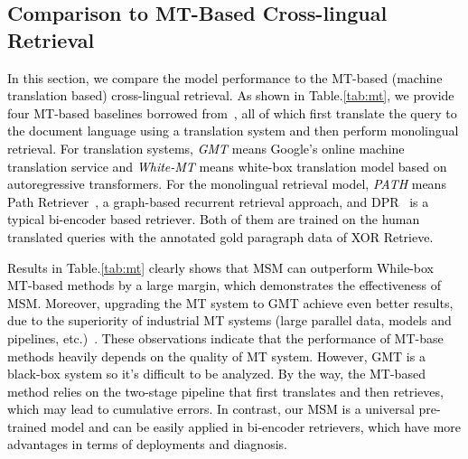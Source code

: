 \subsection{Comparison to MT-Based Cross-lingual Retrieval}
\textcolor{black}{
In this section, we compare the model performance to the MT-based (machine translation based) cross-lingual retrieval. As shown in Table.\ref{tab:mt}, we provide four MT-based baselines borrowed from~\citep{asai-etal-2021-xor}, all of which first translate the query to the document language using a translation system and then perform monolingual retrieval. For translation systems, \textit{GMT} means Google’s online machine translation service and \textit{White-MT} means white-box translation model based on autoregressive transformers. For the monolingual retrieval model, \textit{PATH} means Path Retriever~\citep{asai2019learning}, a graph-based recurrent retrieval approach, and DPR~\citep{DPR2020} is a typical bi-encoder based retriever. Both of them are trained on the human translated queries with the annotated gold paragraph data of XOR Retrieve. 
}

\textcolor{black}{
Results in Table.\ref{tab:mt} clearly shows that MSM can outperform While-box MT-based methods by a large margin, which demonstrates the effectiveness of MSM. Moreover, upgrading the MT system to GMT achieve even better results, due to the superiority
of industrial MT systems (large parallel data, models and pipelines, etc.)~\citep{asai-etal-2021-xor}. These observations indicate that the performance of MT-base methods heavily depends on the quality of MT system. However, GMT is a black-box system so it's difficult to be analyzed. By the way, the MT-based method relies on the two-stage pipeline that first translates and then retrieves, which may lead to cumulative errors. In contrast, our MSM is a universal pre-trained model and can be easily applied in bi-encoder retrievers, which have more advantages in terms of deployments and diagnosis.
}


